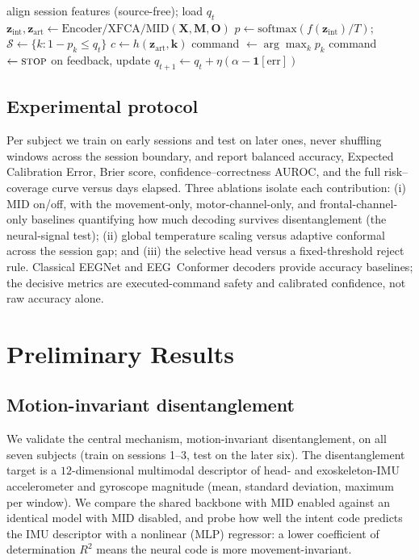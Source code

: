 \documentclass[conference]{IEEEtran}
\begin{document}
\begin{algorithm}[t]
\caption{CALM-Net deployment on session $s$ (per window)}
\label{alg:deploy}
\begin{algorithmic}[1]
\State align session features (source-free); load $q_t$
\State $\mathbf{z}_{\mathrm{int}},\mathbf{z}_{\mathrm{art}}\leftarrow \mathrm{Encoder/XFCA/MID}(\mathbf{X},\mathbf{M},\mathbf{O})$
\State $p\leftarrow \mathrm{softmax}(f(\mathbf{z}_{\mathrm{int}})/T)$;\quad
       $\mathcal{S}\leftarrow\{k:1-p_k\le q_t\}$
\State $c\leftarrow h(\mathbf{z}_{\mathrm{art}},\mathbf{k})$
   \State command $\leftarrow \arg\max_k p_k$
\Else
   \State command $\leftarrow \textsc{stop}$ 
\EndIf
\State on feedback, update $q_{t+1}\leftarrow q_t+\eta(\alpha-\mathbf{1}[\text{err}])$
\end{algorithmic}
\end{algorithm}

\subsection{Experimental protocol}
Per subject we train on early sessions and test on later ones, never shuffling
windows across the session boundary, and report balanced accuracy, Expected
Calibration Error, Brier score, confidence--correctness AUROC, and the full
risk--coverage curve versus days elapsed. Three ablations isolate each contribution:
(i) MID on/off, with the movement-only, motor-channel-only, and frontal-channel-only
baselines quantifying how much decoding survives disentanglement (the neural-signal
test); (ii) global temperature scaling versus adaptive conformal across the session
gap; and (iii) the selective head versus a fixed-threshold reject rule. Classical
EEGNet and EEG~Conformer decoders provide accuracy baselines; the decisive metrics
are executed-command safety and calibrated confidence, not raw accuracy alone.

\section{Preliminary Results}\label{sec:valid}
\subsection{Motion-invariant disentanglement}
We validate the central mechanism, motion-invariant disentanglement, on all seven
subjects (train on sessions 1--3, test on the later six). The disentanglement
target is a $12$-dimensional multimodal descriptor of head- and exoskeleton-IMU
accelerometer and gyroscope magnitude (mean, standard deviation, maximum per
window). We compare the shared backbone with MID enabled against an identical model
with MID disabled, and probe how well the intent code predicts the IMU descriptor
with a nonlinear (MLP) regressor: a lower coefficient of determination $R^2$ means
the neural code is more movement-invariant.
\end{document}
